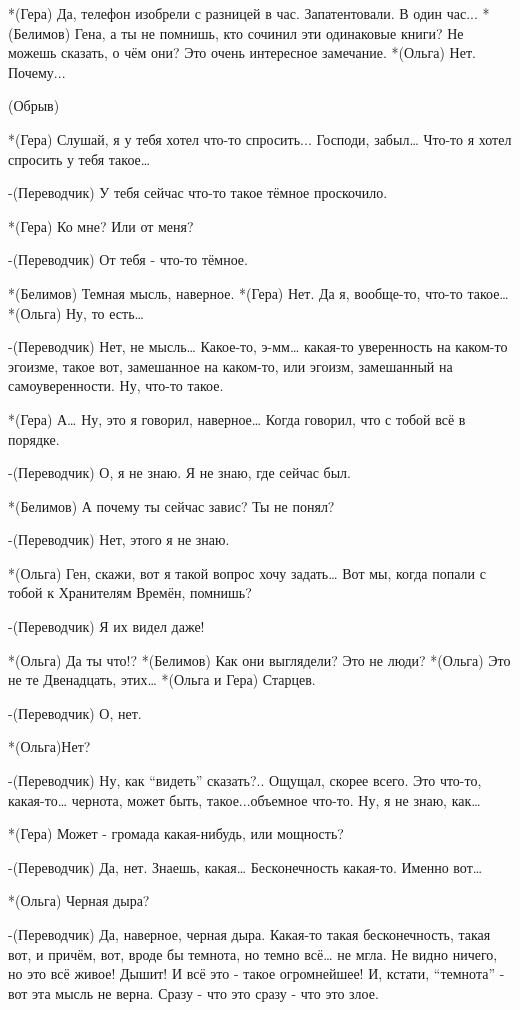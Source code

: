 *(Гера) Да,  телефон изобрели с разницей в час. Запатентовали. В один час...
*(Белимов) Гена, а ты не помнишь, кто сочинил эти одинаковые книги? Не можешь сказать, о чём они? Это очень интересное замечание.
*(Ольга) Нет. Почему...

(Обрыв)

*(Гера) Слушай, я у тебя хотел что-то спросить... Господи, забыл… Что-то я хотел спросить у тебя такое…

-(Переводчик) У тебя сейчас что-то такое тёмное проскочило.

*(Гера) Ко мне? Или от меня?

-(Переводчик) От тебя - что-то тёмное. 

*(Белимов) Темная мысль, наверное.
*(Гера) Нет. Да я, вообще-то, что-то такое…
*(Ольга) Ну, то есть…

-(Переводчик) Нет, не мысль… Какое-то, э-мм… какая-то уверенность  на каком-то эгоизме, такое вот, замешанное на каком-то, или эгоизм, замешанный на самоуверенности. Ну, что-то такое.

*(Гера) А… Ну, это я говорил, наверное…  Когда говорил, что с тобой всё в порядке.

-(Переводчик) О, я не знаю. Я не знаю, где сейчас был.

*(Белимов) А почему ты сейчас завис? Ты не понял?

-(Переводчик) Нет, этого я не знаю.

*(Ольга) Ген, скажи, вот я такой вопрос хочу задать… Вот мы, когда попали с тобой к Хранителям Времён, помнишь?

-(Переводчик) Я их видел даже!

*(Ольга) Да ты что!?
*(Белимов) Как они выглядели? Это не люди?
*(Ольга) Это не те Двенадцать, этих…
*(Ольга и Гера) Старцев.

-(Переводчик) О, нет. 

*(Ольга)Нет?

-(Переводчик) Ну, как “видеть” сказать?.. Ощущал, скорее всего. Это что-то, какая-то… чернота, может быть, такое...объемное что-то. Ну, я не знаю, как… 

*(Гера) Может - громада какая-нибудь,  или мощность?

-(Переводчик) Да, нет. Знаешь, какая… Бесконечность какая-то. Именно вот…

*(Ольга) Черная дыра?

-(Переводчик) Да, наверное, черная дыра. Какая-то такая бесконечность, такая вот, и причём, вот, вроде бы темнота, но темно всё… не мгла. Не видно ничего, но это всё живое! Дышит! И всё это - такое огромнейшее! И, кстати, “темнота” - вот эта мысль не верна. Сразу - что это сразу - что это злое.

